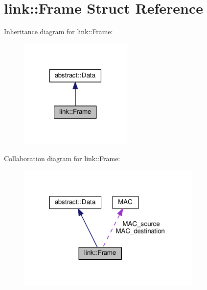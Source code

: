 \hypertarget{structlink_1_1Frame}{}\section{link\+:\+:Frame Struct Reference}
\label{structlink_1_1Frame}


Inheritance diagram for link\+:\+:Frame\+:
\nopagebreak
\begin{figure}[H]
\begin{center}
\leavevmode
\includegraphics[width=159pt]{structlink_1_1Frame__inherit__graph}
\end{center}
\end{figure}


Collaboration diagram for link\+:\+:Frame\+:
\nopagebreak
\begin{figure}[H]
\begin{center}
\leavevmode
\includegraphics[width=258pt]{structlink_1_1Frame__coll__graph}
\end{center}
\end{figure}
